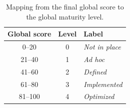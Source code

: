 \begin{table}[htbp]
  \centering
  \caption{Mapping from the final global score to the global maturity level.}
  \label{tab:se-levels}
  \begin{tabular}{@{}ccl@{}}
    \toprule
    Global score & Level & Label \\
    \midrule
    0--20   & 0 & \emph{Not in place} \\
    21--40  & 1 & \emph{Ad hoc} \\
    41--60  & 2 & \emph{Defined} \\
    61--80  & 3 & \emph{Implemented} \\
    81--100 & 4 & \emph{Optimized} \\
    \bottomrule
  \end{tabular}
\end{table}

